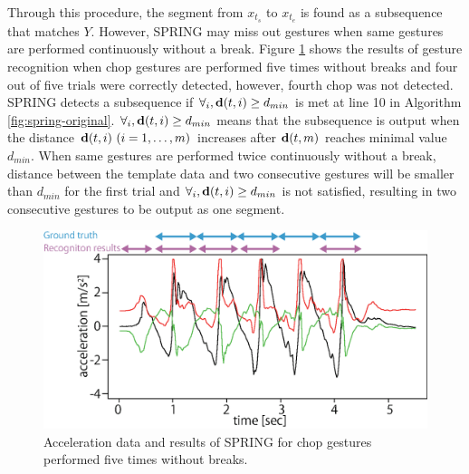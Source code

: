 \documentclass{sigchi-ext}
\begin{document}
        Through this procedure, the segment from $x_{t_s}$ to $x_{t_e}$ is found as a subsequence that matches $Y$. 
        However, SPRING may miss out gestures when same gestures are performed continuously without a break. Figure \ref{fig:miss-chop-5x} shows the results of gesture recognition when chop gestures are performed five times without breaks and four out of five trials were correctly detected, however, fourth chop was not detected. SPRING detects a subsequence if $\forall_i, {\bf d}(t,i) \geq d_{min}$ is met at line 10 in Algorithm \ref{fig:spring-original}. $\forall_i, {\bf d}(t,i) \geq d_{min}$ means that the subsequence is output when the distance ${\bf d}(t,i)~(i=1,\dots,m)$ increases after ${\bf d}(t,m)$ reaches minimal value $d_{min}$. When same gestures are performed twice continuously without a break, distance between the template data and two consecutive gestures will be smaller than $d_{min}$ for the first trial and $\forall_i, {\bf d}(t,i) \geq d_{min}$ is not satisfied, resulting in two consecutive gestures to be output as one segment.
        
        \begin{figure}[!t]
            \centering
            \includegraphics[width=1\linewidth]{images/miss-chop-5x.eps}
            \caption{Acceleration data and results of SPRING for chop gestures performed five times without breaks.}
            \label{fig:miss-chop-5x}
        \end{figure}
\end{document}
